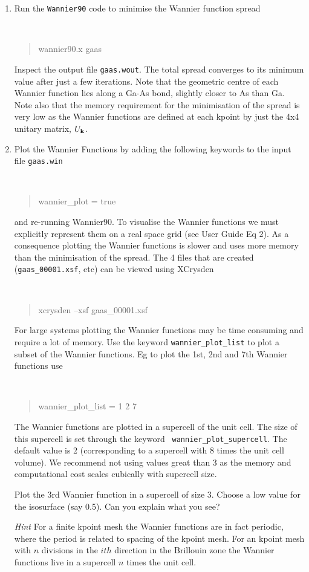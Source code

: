 \documentclass[a4paper,11pt,twoside]{article}
\begin{document}
\begin{enumerate}
\item Run the {\tt Wannier90} code to minimise the Wannier function spread
{\tt
\begin{quote}
wannier90.x gaas
\end{quote} }
Inspect the output file {\tt gaas.wout}. The total spread converges to its
minimum value after just a few iterations. Note that the geometric centre of
each Wannier function lies along a Ga-As bond, slightly closer to As
than Ga. Note also that the memory requirement for the minimisation of
the spread is very low as the Wannier functions are defined at each
kpoint by just the 4x4 unitary matrix, $U_{{\bf k}}$. 
\item Plot the Wannier Functions by adding the following keywords to the input file {\tt gaas.win}
{\tt
\begin{quote}
wannier\_plot = true
\end{quote} }
and re-running Wannier90. To visualise the Wannier functions we must explicitly represent them on
a real space grid (see User Guide Eq 2). As a consequence plotting the
Wannier functions is slower and uses more memory than the minimisation
of the spread. The 4 files that are created ({\tt gaas\_00001.xsf}, etc) can
be viewed using XCrysden 
{\tt
\begin{quote}
xcrysden --xsf gaas\_00001.xsf
\end{quote} }

For large systems plotting the Wannier functions may be time consuming
and require a lot of memory. Use the keyword {\tt wannier\_plot\_list}
to plot a subset of the Wannier functions. Eg to plot the 1st, 2nd and
7th Wannier functions use 
{\tt
\begin{quote}
wannier\_plot\_list = 1 2 7
\end{quote} }
The Wannier functions are plotted in a supercell of the unit cell. The
size of this supercell is set through the keyword {\tt
  wannier\_plot\_supercell}. The default value is 2 (corresponding to a
supercell with 8 times the unit cell volume). We recommend not using
values great than 3 as the memory and computational cost scales
cubically with  supercell size.  

Plot the 3rd Wannier function in a supercell of size 3. Choose a low
value for the isosurface (say 0.5). Can you explain what you see? 


{\it Hint} For a finite kpoint mesh the Wannier functions are in fact
periodic, where the period is related to spacing of the kpoint mesh. For
an kpoint mesh with $n$ divisions in the $ith$ direction in the
Brillouin zone the Wannier functions live in a supercell $n$ times the
unit cell. 
\end{enumerate}
\end{document}
